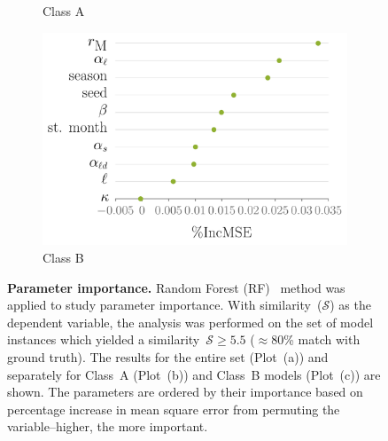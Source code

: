 \documentclass[11pt]{article}
\newcommand{\similarity}{\mathcal{S}}
\newcommand{\mooreRange}{r_\mathrm{M}}
\theoremstyle{definition}
\begin{document}
\begin{figure}[t]
\begin{subfigure}[b]{.32\textwidth}
\caption{Class A\label{fig:rfShort}}
\end{subfigure}
\begin{subfigure}[b]{.32\textwidth}
\includegraphics[width=1.1\textwidth]{../cellular_automata/results/rf/rf_importance_long_mse.pdf}
\caption{Class B\label{fig:rfLong}}
\end{subfigure}
\caption{\textbf{Parameter importance.} Random Forest
(RF)~\cite{breiman2001random} method was applied to study parameter
importance. With similarity~($\similarity$) as the dependent variable, the
analysis was performed on the set of model instances which yielded a
similarity~$\similarity\ge5.5$ ($\approx80$\% match with ground truth). The
results for the entire set (Plot~(a)) and separately for Class~A (Plot~(b))
and Class~B models (Plot~(c)) are shown. The parameters are ordered by
their importance based on percentage increase in mean square error from
permuting the variable--higher, the more important.
\label{fig:sensitivity}}
\end{figure}
\end{document}
